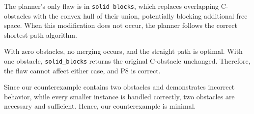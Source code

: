 \documentclass[11pt]{article}
\begin{document}
The planner's only flaw is in \texttt{solid\_blocks}, which replaces overlapping C-obstacles with the convex hull of their union, potentially blocking additional free space. When this modification does not occur, the planner follows the correct shortest-path algorithm.

With zero obstacles, no merging occurs, and the straight path is optimal. With one obstacle, \texttt{solid\_blocks} returns the original C-obstacle unchanged. Therefore, the flaw cannot affect either case, and P8 is correct.

Since our counterexample contains two obstacles and demonstrates incorrect behavior, while every smaller instance is handled correctly, two obstacles are necessary and sufficient. Hence, our counterexample is minimal.
\end{document}
